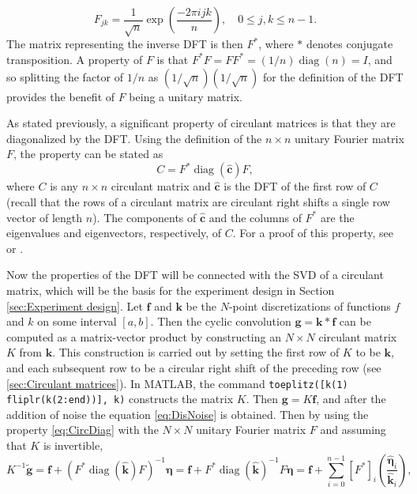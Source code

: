 \documentclass[12pt]{article}
\newcommand{\kcon}{k}
\newcommand{\fcon}{f}
\newcommand{\gdis}{\mathbf{g}}
\newcommand{\gnoise}{\widetilde{\mathbf{g}}}
\newcommand{\kdis}{\mathbf{k}}
\newcommand{\kmat}{K}	%
\newcommand{\fdis}{\mathbf{f}}
\newcommand{\ctrans}{*}	%
\newcommand{\diag}{\operatorname{diag}}	%
\newcommand{\noise}{\bm{\eta}}	%
\begin{document}
\begin{equation}
F_{jk} = \frac{1}{\sqrt{n}}\exp\left(\frac{-2\pi{ijk}}{n}\right), \quad 0 \leq j,k \leq n-1.
\label{eq:DFT-Matrix}
\end{equation}
The matrix representing the inverse DFT is then $F^\ctrans$, where $\ctrans$ denotes conjugate transposition. A property of $F$ is that $F^\ctrans F = FF^\ctrans = (1/n)\diag(n) = I$, and so splitting the factor of $1/n$ as $(1/\sqrt{n})(1/\sqrt{n})$ for the definition of the DFT provides the benefit of $F$ being a unitary matrix. \par 
As stated previously, a significant property of circulant matrices is that they are diagonalized by the DFT. Using the definition of the $n \times n$ unitary Fourier matrix $F$, the property can be stated as
\begin{equation}
C = F^\ctrans\diag(\widehat{\mathbf{c}})F,
\label{eq:CircDiag}
\end{equation}
where $C$ is any $n \times n$ circulant matrix and $\widehat{\mathbf{c}}$ is the DFT of the first row of $C$ (recall that the rows of a circulant matrix are circulant right shifts a single row vector of length $n$). The components of $\widehat{\mathbf{c}}$ and the columns of $F^\ctrans$ are the eigenvalues and eigenvectors, respectively, of $C$. For a proof of this property, see \cite{BoggessAlbert2001Afci} or \cite{Vogel:2002}. \par
Now the properties of the DFT will be connected with the SVD of a circulant matrix, which will be the basis for the experiment design in Section \ref{sec:Experiment design}. Let $\fdis$ and $\kdis$ be the $N$-point discretizations of functions $\fcon$ and $\kcon$ on some interval $[a,b]$. Then the cyclic convolution $\gdis = \kdis * \fdis$ can be computed as a matrix-vector product by constructing an $N \times N$ circulant matrix $\kmat$ from $\kdis$. This construction is carried out by setting the first row of $\kmat$ to be $\kdis$, and each subsequent row to be a circular right shift of the preceding row (see \ref{sec:Circulant matrices}). In MATLAB, the command \texttt{toeplitz([k(1) fliplr(k(2:end))], k)} constructs the matrix $\kmat$. Then $\gdis = \kmat\fdis$, and after the addition of noise the equation \eqref{eq:DisNoise} is obtained. Then by using the property \eqref{eq:CircDiag} with the $N \times N$ unitary Fourier matrix $F$ and assuming that $\kmat$ is invertible, 
\begin{equation}
\kmat^{-1}\gnoise = \fdis + (F^*\diag(\widehat{\kdis})F)^{-1}\noise = \fdis + F^*\diag(\widehat{\kdis})^{-1}F\noise = \fdis + \sum_{i = 0}^{n-1} [F^*]_i\left(\frac{\widehat{\noise}_i}{\widehat{\kdis}_i}\right),
\label{eq:InvProdDFT}
\end{equation}
\end{document}
